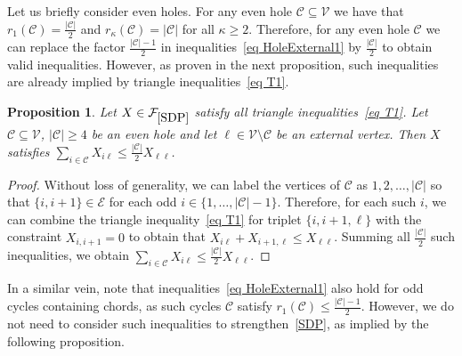 \documentclass[11pt, a4paper]{article}
\newtheorem{proposition}[theorem]{Proposition}
\newcommand{\mc}{\mathcal}
\begin{document}
Let us briefly consider even holes.
For any even hole $\mc{C} \subseteq \mc{V}$ we have that $r_1(\mc{C}) = \frac{|\mc{C}|}{2}$ and $r_\kappa(\mc{C}) = |\mc{C}|$ for all $\kappa \geq 2$. 
Therefore, for any even hole $\mc{C}$ we can replace the factor $\frac{|\mc{C}|-1}{2}$ in inequalities~\eqref{eq HoleExternal1} by $\frac{|\mc{C}|}{2}$ to obtain valid inequalities.
However, as proven in the next proposition, such inequalities are already implied by triangle inequalities~\eqref{eq T1}.
\begin{proposition} \label{Prop: no even holes}
    Let $X \in \mc{F}_{\eqref{SDP}}$ satisfy all triangle inequalities~\eqref{eq T1}. 
    Let $\mc{C} \subseteq \mc{V}$, $|\mc{C}| \geq 4$ be an even hole and let $\ell \in \mc{V} \setminus \mc{C}$ be an external vertex. 
    Then $X$ satisfies $\sum_{i \in \mc{C}} X_{i\ell} \leq \frac{|\mc{C}|}{2} X_{\ell\ell}$.
\end{proposition}
\begin{proof}
    Without loss of generality, we can label the vertices of $\mc{C}$ as $1, 2, \hdots, |\mc{C}|$ so that $\{i, i+1\} \in \mc{E}$ for each odd $i \in \{1, \hdots, |\mc{C}|-1\}$. 
    Therefore, for each such $i$, we can combine the triangle inequality~\eqref{eq T1} for triplet $\{i,i+1, \ell\}$ with the constraint $X_{i,i+1} = 0$ to obtain that $X_{i\ell} + X_{i+1, \ell} \leq X_{\ell\ell}$. 
    Summing all $\frac{|\mc{C}|}{2}$ such inequalities, we obtain $\sum_{i \in \mc{C}} X_{i\ell} \leq \frac{|\mc{C}|}{2} X_{\ell\ell}$.
\end{proof}

In a similar vein, note that inequalities~\eqref{eq HoleExternal1} also hold for odd cycles containing chords, as such cycles $\mc{C}$ satisfy $r_1(\mc{C}) \leq \frac{|\mc{C}|-1}{2}$. 
However, we do not need to consider such inequalities to strengthen~\eqref{SDP}, as implied by the following proposition.
\end{document}
